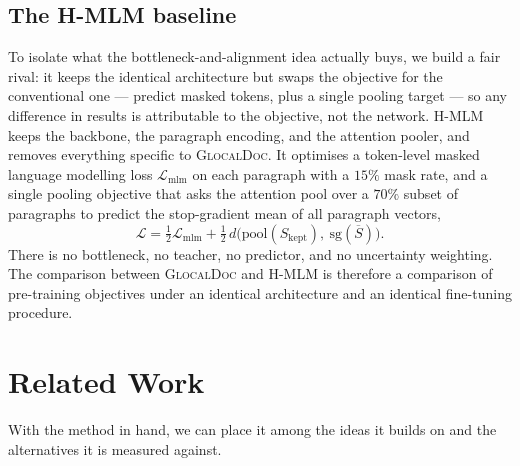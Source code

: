 \documentclass[conference]{IEEEtran}
\newcommand{\glocal}{\textsc{GlocalDoc}}
\newcommand{\hmlm}{\mbox{H-MLM}}
\begin{document}
\subsection{The H-MLM baseline}
To isolate what the bottleneck-and-alignment idea actually buys, we build a fair
rival: it keeps the identical architecture but swaps the objective for the
conventional one --- predict masked tokens, plus a single pooling target --- so any
difference in results is attributable to the objective, not the network. \hmlm{}
keeps the backbone, the paragraph encoding, and the attention pooler, and
removes everything specific to \glocal{}. It optimises a token-level masked language
modelling loss $\mathcal{L}_{\mathrm{mlm}}$ on each paragraph with a $15\%$ mask
rate, and a single pooling objective that asks the attention pool over a $70\%$
subset of paragraphs to predict the stop-gradient mean of all paragraph vectors,
\begin{equation}
\mathcal{L} = \tfrac{1}{2}\mathcal{L}_{\mathrm{mlm}}
+ \tfrac{1}{2}\,d\big(\mathrm{pool}(S_{\mathrm{kept}}),\ \mathrm{sg}(\overline{S})\big).
\end{equation}
There is no bottleneck, no teacher, no predictor, and no uncertainty weighting. The
comparison between \glocal{} and \hmlm{} is therefore a comparison of pre-training
objectives under an identical architecture and an identical fine-tuning procedure.

\section{Related Work}
With the method in hand, we can place it among the ideas it builds on and the
alternatives it is measured against.
\end{document}
